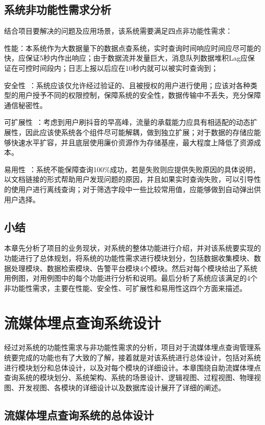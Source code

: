 \section{系统非功能性需求分析}

结合项目要解决的问题及应用场景，该系统需要满足四点非功能性需求：

性能：本系统作为大数据量下的数据点查系统，实时查询时间响应时间应尽可能的快，应保证5秒内作出响应；由于数据流并发量巨大，消息队列数据堆积Lag应保证在可控时间段内；日志上报以后应在10秒内就可以被实时查询到；

安全性~\cite{王伟2013rpci}：系统应该仅允许经过验证的、且被授权的用户进行使用；应该对各种类型的用户授予不同的权限控制，保障系统的安全性，数据传输中不丢失，充分保障通信秘密性。

可扩展性~\cite{寇雅楠2003基于}：考虑到用户刷抖音的早高峰，流量的承载能力应具有相适配的动态扩展性，因此应该使系统各个组件尽可能解耦，做到独立扩展；对于数据的存储应能够快速水平扩容，并且底层使用廉价资源作为存储基座，最大程度上降低了资源成本。

易用性~\cite{肖国栋2009基于易用性的人机界面评价}：系统不能保障查询100$\%$成功，若是失败则应提供失败原因的具体说明，以文档链接的形式帮助用户发现问题的原因，并且如果实时查询失败，可以引导性的使用户进行离线查询；对于筛选字段中一些比较常用值，应能够做到自动弹出供用户选择。

\section{小结}
本章先分析了项目的业务现状，对系统的整体功能进行介绍，并对该系统要实现的功能进行了总体规划，将系统的功能性需求进行模块划分，包括数据收集模块、数据处理模块、数据检索模块、告警平台模块4个模块。然后对每个模块给出了系统用例图，对用例图中的每个功能进行分析和说明。最后分析了系统应该满足的4个非功能性需求，主要在性能、安全性、可扩展性和易用性这四个方面来描述。 
\chapter{流媒体埋点查询系统设计}

经过对系统的功能性需求与非功能性需求的分析，项目对于流媒体埋点查询管理系统要完成的功能也有了大致的了解，接着就是对该系统进行总体设计，包括对系统进行模块划分和总体设计，以及对每个模块的详细设计。本章围绕自助流媒体埋点查询系统的模块划分、系统架构、系统的场景设计、逻辑视图、过程视图、物理视图、开发视图、各模块的详细设计以及数据库设计展开了详细的阐述。
\section{流媒体埋点查询系统的总体设计}
